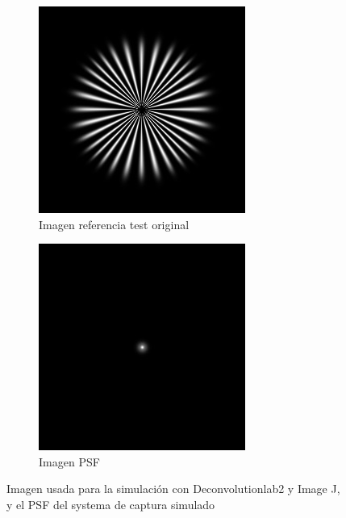 \documentclass{./packages/optica-article}
\begin{document}
\begin{figure}[hbp]
	\centering
	\begin{subfigure}[t]{0.45\textwidth}\centering
		\centering
		\includegraphics[width=\textwidth]{Simulation deconvolution/ref.jpg}
		\caption{Imagen referencia test original}\label{fig:ref}
	\end{subfigure}
	\hfill
	\begin{subfigure}[t]{0.45\textwidth}\centering
		\includegraphics[width=\textwidth]{Simulation deconvolution/psf.jpg}
		\caption{Imagen PSF}\label{fig:psf}
	\end{subfigure}

	\caption{Imagen usada para la simulación con Deconvolutionlab2 y Image J, y el PSF del systema de captura simulado}\label{fig:image:ref-psf}
\end{figure}
\end{document}
